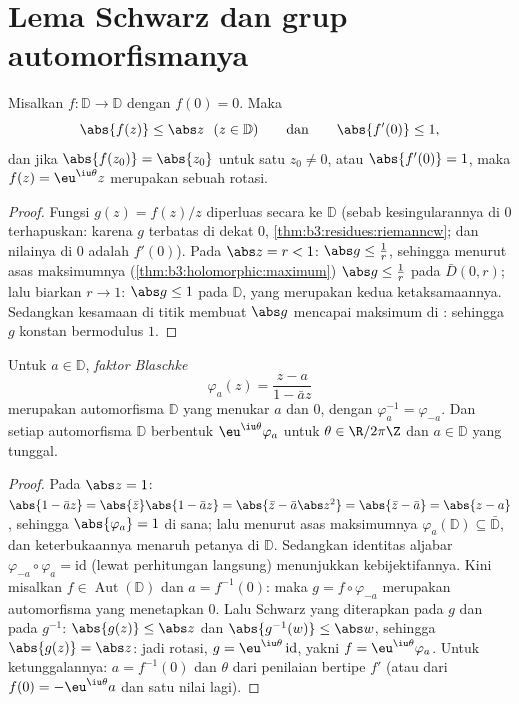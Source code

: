 \section{Lema Schwarz dan grup automorfismanya}

\begin{theorem}\label{thm:b3:conformal:schwarz}
Misalkan $f \colon \mathbb D \to \mathbb D$  dengan
$f(0) = 0$. Maka
\[
\abs{f(z)} \leq \abs z \ \ (z \in \mathbb D)
\qquad\text{dan}\qquad \abs{f'(0)} \leq 1 ,
\]
dan jika $\abs{f(z_0)} = \abs{z_0}$ untuk satu $z_0 \neq 0$, atau
$\abs{f'(0)} = 1$, maka $f(z) = \eu^{\iu\theta}z$ merupakan sebuah
rotasi.
\end{theorem}

\begin{proof}
Fungsi $g(z) = f(z)/z$ diperluas secara  ke $\mathbb D$ (sebab
kesingularannya di $0$ terhapuskan: karena $g$ terbatas di dekat $0$,
\cref{thm:b3:residues:riemanncw}; dan nilainya di $0$ adalah
$f'(0)$). Pada $\abs z = r < 1$: $\abs g \leq \frac1r$, sehingga menurut
asas maksimumnya (\cref{thm:b3:holomorphic:maximum})
$\abs g \leq \frac1r$ pada $\bar D(0,r)$; lalu biarkan $r \to 1$: $\abs
g \leq 1$ pada $\mathbb D$, yang merupakan kedua ketaksamaannya. Sedangkan kesamaan
di titik  membuat $\abs g$ mencapai maksimum di
: sehingga $g$ konstan bermodulus $1$.
\end{proof}

\begin{theorem}
\label{thm:b3:conformal:autdisc}
Untuk $a \in \mathbb D$, \emph{faktor
Blaschke}
\[
\varphi_a(z) = \frac{z - a}{1 - \bar a z}
\]
merupakan automorfisma $\mathbb D$ yang menukar $a$ dan $0$, dengan
$\varphi_a^{-1} = \varphi_{-a}$. Dan setiap automorfisma
$\mathbb D$ berbentuk $\eu^{\iu\theta}\varphi_a$ untuk $\theta
\in \R/2\pi\Z$ dan $a \in \mathbb D$ yang tunggal.
\end{theorem}

\begin{proof}
Pada $\abs z = 1$: $\abs{1 - \bar az} = \abs{\bar z}\abs{1 -
\bar az} = \abs{\bar z - \bar a\abs z^2} = \abs{\bar z - \bar
a} = \abs{z - a}$, sehingga $\abs{\varphi_a} = 1$ di sana; lalu menurut
asas maksimumnya $\varphi_a(\mathbb D) \subseteq \bar{\mathbb
D}$, dan keterbukaannya menaruh petanya di $\mathbb D$. Sedangkan
identitas aljabar $\varphi_{-a}\circ\varphi_a = \mathrm{id}$ (lewat
perhitungan langsung) menunjukkan kebijektifannya. Kini misalkan $f \in
\operatorname{Aut}(\mathbb D)$ dan $a = f^{-1}(0)$: maka $g =
f\circ\varphi_{-a}$ merupakan automorfisma yang menetapkan $0$. Lalu Schwarz
yang diterapkan pada $g$ dan pada $g^{-1}$: $\abs{g(z)} \leq \abs z$ dan
$\abs{g^{-1}(w)} \leq \abs w$, sehingga $\abs{g(z)} = \abs z$: jadi
rotasi, $g = \eu^{\iu\theta}\,\mathrm{id}$, yakni $f =
\eu^{\iu\theta}\varphi_a$. Untuk ketunggalannya: $a = f^{-1}(0)$ dan
$\theta$ dari penilaian bertipe $f'$ (atau dari $f(0) =
-\eu^{\iu\theta}a$ dan satu nilai lagi).
\end{proof}

